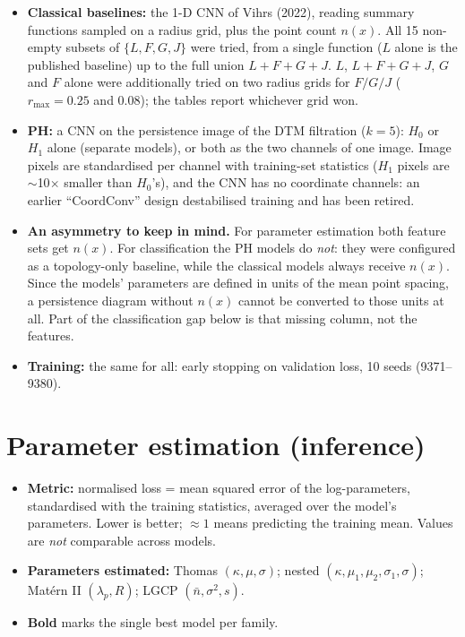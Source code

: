 \documentclass[10pt,a4paper]{article}
\newcommand{\nbar}{\bar n}
\begin{document}
\begin{itemize}
  \item \textbf{Classical baselines:} the 1-D CNN of Vihrs (2022), reading summary functions sampled on a radius grid, plus the point count $n(x)$. All 15 non-empty subsets of $\{L,F,G,J\}$ were tried, from a single function ($L$ alone is the published baseline) up to the full union $L{+}F{+}G{+}J$. $L$, $L{+}F{+}G{+}J$, $G$ and $F$ alone were additionally tried on two radius grids for $F/G/J$ ($r_{\max}=0.25$ and $0.08$); the tables report whichever grid won.
  \item \textbf{PH:} a CNN on the persistence image of the DTM filtration ($k=5$): $H_0$ or $H_1$ alone (separate models), or both as the two channels of one image. Image pixels are standardised per channel with training-set statistics ($H_1$ pixels are $\sim$10$\times$ smaller than $H_0$'s), and the CNN has no coordinate channels: an earlier ``CoordConv'' design destabilised training and has been retired.
  \item \textbf{An asymmetry to keep in mind.} For parameter estimation both feature sets get $n(x)$. For classification the PH models do \emph{not}: they were configured as a topology-only baseline, while the classical models always receive $n(x)$. Since the models' parameters are defined in units of the mean point spacing, a persistence diagram without $n(x)$ cannot be converted to those units at all. Part of the classification gap below is that missing column, not the features.
  \item \textbf{Training:} the same for all: early stopping on validation loss, 10 seeds (9371--9380).
\end{itemize}

\section{Parameter estimation (inference)}

\begin{itemize}
  \item \textbf{Metric:} normalised loss = mean squared error of the log-parameters, standardised with the training statistics, averaged over the model's parameters. Lower is better; $\approx 1$ means predicting the training mean. Values are \emph{not} comparable across models.
  \item \textbf{Parameters estimated:} Thomas $(\kappa,\mu,\sigma)$; nested $(\kappa,\mu_1,\mu_2,\sigma_1,\sigma)$; Mat\'ern II $(\lambda_p,R)$; LGCP $(\nbar,\sigma^2,s)$.
  \item \textbf{Bold} marks the single best model per family.
\end{itemize}
\end{document}
